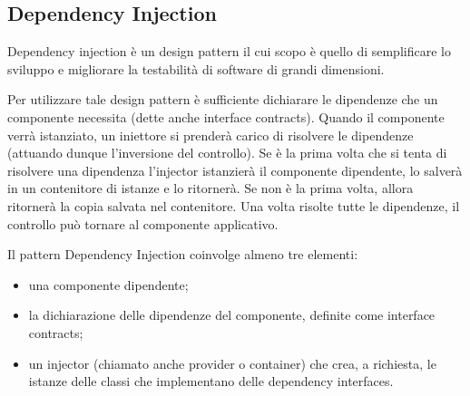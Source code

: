 \subsection{Dependency Injection}
Dependency injection è un design pattern il cui scopo è quello di semplificare lo sviluppo e migliorare la testabilità di software di grandi dimensioni.

Per utilizzare tale design pattern è sufficiente dichiarare le dipendenze che un componente necessita (dette anche interface contracts).
Quando il componente verrà istanziato, un iniettore si prenderà carico di risolvere le dipendenze (attuando dunque l'inversione del controllo).
Se è la prima volta che si tenta di risolvere una dipendenza l'injector istanzierà il componente dipendente, lo salverà in un contenitore di istanze e lo ritornerà. Se non è la prima volta, allora ritornerà la copia salvata nel contenitore.
Una volta risolte tutte le dipendenze, il controllo può tornare al componente applicativo.

Il pattern Dependency Injection coinvolge almeno tre elementi:
\begin{itemize}
\item una componente dipendente;
\item la dichiarazione delle dipendenze del componente, definite come interface contracts;
\item un injector (chiamato anche provider o container) che crea, a richiesta, le istanze delle classi che implementano delle dependency interfaces.
\end{itemize}

